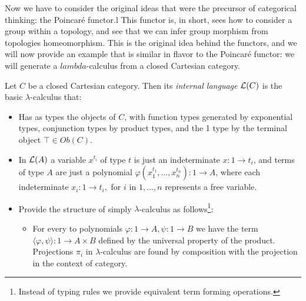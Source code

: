 Now we have to consider the original ideas that were the precursor of categorical thinking: the Poincaré functor.l This functor is, in short,  sees how to consider a group within a topology, and see that we can infer group morphism from topologies homeomorphism. This is the original idea behind the functors, and we will now provide an example that is similar in flavor to the Poincaré functor: we will generate a $lambda$-calculus from a closed Cartesian category.\\ 



\begin{definition}
  Let $C$ be a closed Cartesian category. Then its \emph{internal language} $\mathcal{L} (C)$ is the basic $\lambda$-calculus that:
  \begin{itemize}
  \item Has as types the objects of $C$, with function types generated by exponential types, conjunction types by product types, and the 1 type by the terminal object $\top \in Ob(C)$.%
  \item In $\mathcal{L}(A)$ a variable $x^{t_i}$ of type $t$ is just an indeterminate  $x:1 \to t_i$, and terms of type $A$ are just a polynomial $\varphi(x_1^{t_1},...,x_n^{t_n}):1 \to A$, where each indeterminate $x_i: 1 \to t_i,$ for $i$ in $1,...,n$ represents a free variable.
  \item Provide the structure of simply $\lambda$-calculus as follows\footnote{Instead of typing rules we provide equivalent term forming operations.}:
    \begin{itemize}
    \item For every to polynomials $\varphi: 1 \to A, \psi: 1\to B$ we have the term $\langle \varphi, \psi \rangle: 1 \to A\times B$ defined by the universal property of the product. Projections $\pi_i$ in $\lambda$-calculus are found by composition with the projection in the context of category.

\end{itemize}
\end{itemize}
\end{definition}
